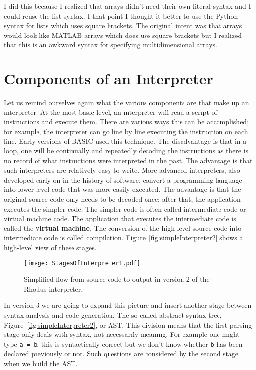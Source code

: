 I did this because I realized that arrays didn't need their own literal syntax and I could reuse the list syntax. I that point I thought it better to use the Python syntax for lists which uses square brackets. The original intent was that arrays would look like MATLAB arrays which does use square brackets but I realized that this is an awkward syntax for specifying multidimensional arrays.

\section{Components of an Interpreter}

Let us remind ourselves again what the various components are that make up an interpreter. At the most basic level, an interpreter will read a script of instructions and execute them. There are various ways this can be accomplished; for example, the interpreter can go line by line executing the instruction on each line. Early versions of BASIC used this technique. The disadvantage is that in a loop, one will be continually and repeatedly decoding the instructions as there is no record of what instructions were interpreted in the past. The advantage is that such interpreters are relatively easy to write. More advanced interpreters, also developed early on in the history of software, convert a programming language into lower level code that was more easily executed. The advantage is that the original source code only needs to be decoded once; after that, the application executes the simpler code. The simpler code is often called intermediate code or virtual machine code. The application that executes the intermediate code is called the {\bf virtual machine}. The conversion of the high-level source code into intermediate code is called compilation. Figure~\ref{fig:simpleInterpreter2} shows a high-level view of these stages.

\begin{figure}[htpb]
\centering
\texttt{[image: StagesOfInterpreter1.pdf]}
\caption{Simplified flow from source code to output in version 2 of the Rhodus interpreter.}
\label{fig:simpleInterpreter1}
\end{figure}

In version 3 we are going to expand this picture and insert another stage between syntax analysis and code generation. The so-called abstract syntax tree, Figure~\ref{fig:simpleInterpreter2}, or AST. This division means that the first parsing stage only deals with syntax, not necessarily meaning. For example one might type {\tt a = b}, this is syntactically correct but we don't know whether {\tt b} has been declared previously or not. Such questions are considered by the second stage when we build the AST.

